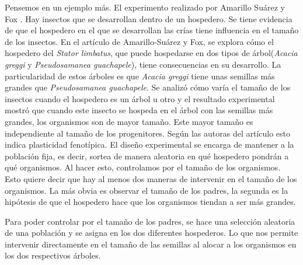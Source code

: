 Pensemos en un ejemplo más. El experimento realizado por Amarillo Suárez y Fox \citeyear{Amarillo-Suarez2006}. Hay insectos que se
desarrollan dentro de un hospedero. Se tiene evidencia de que el hospedero en el que se desarrollan las crías tiene influencia en
el tamaño de los insectos. En el artículo de Amarillo-Suárez y Fox, se explora cómo el hospedero del \emph{Stator limbatus}, que
puede hospedarse en dos tipos de árbol(\emph{Acacia greggi} y \emph{Pseudosamanea guachapele}), tiene consecuencias en su
desarrollo. La particularidad de estos árboles es que \emph{Acacia greggi} tiene unas semillas más grandes que \emph{Pseudosamanea
guachapele}. Se analizó cómo varía el tamaño de los insectos cuando el hospedero es un árbol u otro y el resultado experimental mostró que cuando este insecto se hospeda en el árbol con las semillas más grandes, los organismos son de mayor tamaño. Este mayor tamaño es independiente al tamaño de los progenitores. Según las autoras del artículo esto indica plasticidad fenotípica. El diseño experimental se encarga de mantener a la población fija, es decir, sortea de manera aleatoria en qué hospedero pondrán a qué organismos. Al hacer esto, controlamos por el tamaño de los organismos. Esto quiere decir que hay al menos dos maneras de intervenir en el tamaño de los organismos. La más obvia es observar el tamaño de los padres, la segunda es la hipótesis de que el hospedero hace que los organismos tiendan a ser más grandes.

\begin{center}
\end{center}


Para poder controlar por el tamaño de los padres, se hace una selección aleatoria de una población y se asigna en los dos diferentes hospederos. Lo que nos permite intervenir directamente en el tamaño de las semillas al alocar a los organismos en los dos respectivos árboles.

